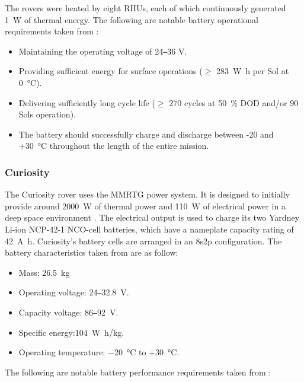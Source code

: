 The rovers were heated by eight \acp{RHU}, each of which continuously generated \SI{1}{\watt} of thermal energy. The following are notable battery operational requirements taken from :

\begin{itemize}
  \item Maintaining the operating voltage of 24‒36 \si{\volt}.
  \item Providing sufficient energy for surface operations ($\geq$ \SI{283}{\watt\hour} per Sol at \SI{0}{\celsius}).
  \item Delivering sufficiently long cycle life ($\geq$ 270 cycles at \SI{50}{\percent} \ac{DOD} and/or 90 Sols operation).
  \item The battery should successfully charge and discharge between -20 and +\SI{30}{\celsius} throughout the length of the entire mission.
\end{itemize}

\subsubsection{Curiosity}
The Curiosity rover uses the \ac{MMRTG} power system. It is designed to initially provide around \SI{2000}{\watt} of thermal power and \SI{110}{\watt} of electrical power in a deep space environment . The electrical output is used to charge its two Yardney \ac{Li-ion} NCP-42-1 \ac{NCO}-cell batteries, which have a nameplate capacity rating of \SI{42}{\ampere\hour}. Curiosity's battery cells are arranged in an 8s2p configuration. The battery characteristics taken from  are as follow:

\begin{itemize}
   \item Mass: \SI{26.5}{\kilo\gram}
   \item Operating voltage: 24‒\SI{32.8}{\volt}.
   \item Capacity voltage: 86‒\SI{92}{\volt}.
   \item Specific energy:\SI{104}{\watt\hour/\kilo\gram}.
   \item Operating temperature: \SI{-20}{\celsius} to +\SI{30}{\celsius}.
\end{itemize}

The following are notable battery performance requirements taken from :

